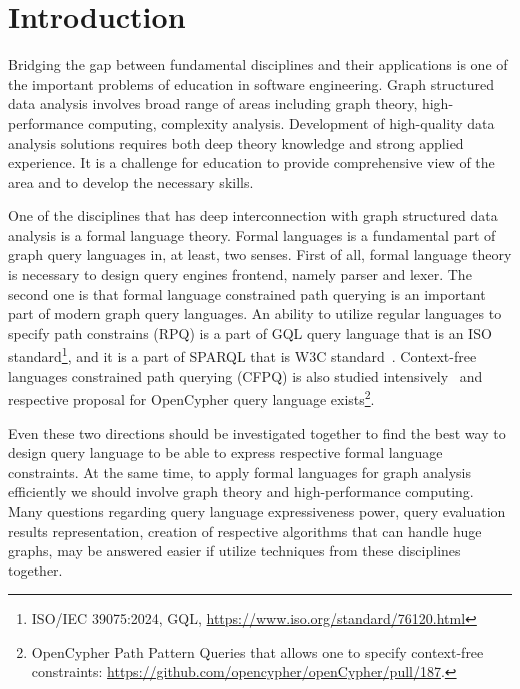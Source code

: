 \documentclass[sigconf]{acmart}
\begin{document}
\section{Introduction}

Bridging the gap between fundamental disciplines and their applications is one of the important problems of education in software engineering.
Graph structured data analysis involves broad range of areas including graph theory, high-performance computing, complexity analysis.
Development of high-quality data analysis solutions requires both deep theory knowledge and strong applied experience. 
It is a challenge for education to provide comprehensive view of the area and to develop the necessary skills.

One of the disciplines that has deep interconnection with graph structured data analysis is a formal language theory.
Formal languages is a fundamental part of graph query languages in, at least, two senses.
First of all, formal language theory is necessary to design query engines frontend, namely parser and lexer.
The second one is that formal language constrained path querying is an important part of modern graph query languages. 
An ability to utilize regular languages to specify path constrains (RPQ) is a part of GQL query language that is an ISO standard\footnote{ISO/IEC 39075:2024, GQL, \url{https://www.iso.org/standard/76120.html}}, and it is a part of SPARQL that is W3C standard~\cite{2013sparql}.
Context-free languages constrained path querying (CFPQ) is also studied intensively~\cite{10.1145/3335783.3335791,10.1145/3167132.3167265,HELLINGS2025102475,10.1145/3398682.3399163} and respective proposal for OpenCypher query language exists\footnote{OpenCypher Path Pattern Queries that allows one to specify context-free constraints: \url{https://github.com/opencypher/openCypher/pull/187}.}.

Even these two directions should be investigated together to find the best way to design query language to be able to express respective formal language constraints.
At the same time, to apply formal languages for graph analysis efficiently we should involve graph theory and high-performance computing.
Many questions regarding query language expressiveness power, query evaluation results representation, creation of respective algorithms that can handle huge graphs, may be answered easier if utilize techniques from these disciplines together.
\end{document}
